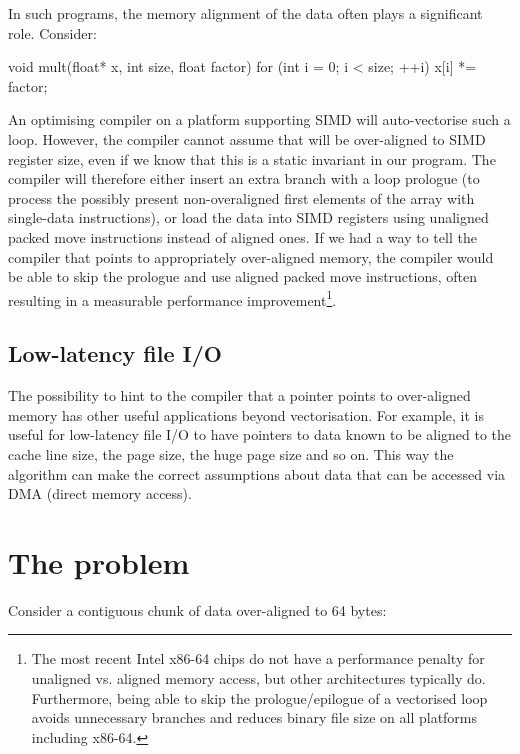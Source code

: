 In such programs, the memory alignment of the data often plays a significant role. Consider:

\begin{codeblock}
void mult(float* x, int size, float factor)
{    
    for (int i = 0; i < size; ++i)
        x[i] *= factor;
}
\end{codeblock}

An optimising compiler on a platform supporting SIMD will auto-vectorise such a loop. However, the compiler cannot assume that  will be over-aligned to SIMD register size, even if we know that this is a static invariant in our program. The compiler will therefore either insert an extra branch with a loop prologue (to process the possibly present non-overaligned first elements of the array with single-data instructions), or load the data into SIMD registers using unaligned packed move instructions instead of aligned ones. If we had a way to tell the compiler that  points to appropriately over-aligned memory, the compiler would be able to skip the prologue and use aligned packed move instructions, often resulting in a measurable performance improvement\footnote{The most recent Intel x86-64 chips do not have a performance penalty for unaligned vs. aligned memory access, but other architectures typically do. Furthermore, being able to skip the prologue/epilogue of a vectorised loop avoids unnecessary branches and reduces binary file size on all platforms including x86-64.}.


\subsection{Low-latency file I/O}

The possibility to hint to the compiler that a pointer points to over-aligned memory has other useful applications beyond vectorisation. For example, it is useful for low-latency file I/O to have pointers to data known to be aligned to the cache line size, the page size, the huge page size and so on. This way the algorithm can make the correct assumptions about data that can be accessed via DMA (direct memory access).

\section{The problem}

Consider a contiguous chunk of data over-aligned to 64 bytes:

